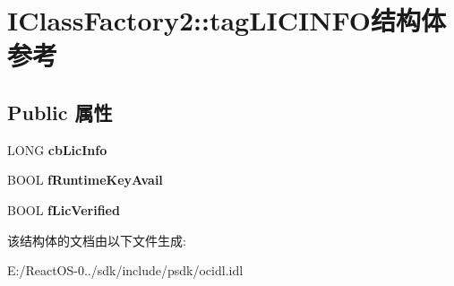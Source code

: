\hypertarget{struct_i_class_factory2_1_1tag_l_i_c_i_n_f_o}{}\section{I\+Class\+Factory2\+:\+:tag\+L\+I\+C\+I\+N\+F\+O结构体 参考}
\label{struct_i_class_factory2_1_1tag_l_i_c_i_n_f_o}
\subsection*{Public 属性}
\begin{DoxyCompactItemize}
\item 
\mbox{\label{struct_i_class_factory2_1_1tag_l_i_c_i_n_f_o_a7f2d695bf0a9030be311d7f5025b7603}} 
L\+O\+NG {\bfseries cb\+Lic\+Info}
\item 
\mbox{\label{struct_i_class_factory2_1_1tag_l_i_c_i_n_f_o_abf7878f396fa8f63233380561c651e8f}} 
B\+O\+OL {\bfseries f\+Runtime\+Key\+Avail}
\item 
\mbox{\label{struct_i_class_factory2_1_1tag_l_i_c_i_n_f_o_a42fd4babea3c3ad26cef47495e741f3b}} 
B\+O\+OL {\bfseries f\+Lic\+Verified}
\end{DoxyCompactItemize}


该结构体的文档由以下文件生成\+:\begin{DoxyCompactItemize}
\item 
E\+:/\+React\+O\+S-\/0../sdk/include/psdk/ocidl.\+idl\end{DoxyCompactItemize}
